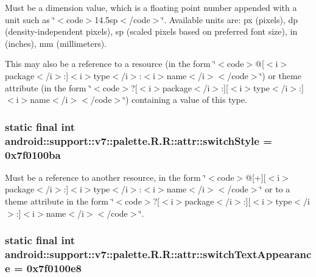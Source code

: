 Must be a dimension value, which is a floating point number appended with a unit such as \char`\"{}$<$code$>$14.5sp$<$/code$>$\char`\"{}. Available units are: px (pixels), dp (density-independent pixels), sp (scaled pixels based on preferred font size), in (inches), mm (millimeters). 

This may also be a reference to a resource (in the form \char`\"{}$<$code$>$@\mbox{[}$<$i$>$package$<$/i$>$:\mbox{]}$<$i$>$type$<$/i$>$:$<$i$>$name$<$/i$>$$<$/code$>$\char`\"{}) or theme attribute (in the form \char`\"{}$<$code$>$?\mbox{[}$<$i$>$package$<$/i$>$:\mbox{]}\mbox{[}$<$i$>$type$<$/i$>$:\mbox{]}$<$i$>$name$<$/i$>$$<$/code$>$\char`\"{}) containing a value of this type. \hypertarget{classandroid_1_1support_1_1v7_1_1palette_1_1_r_1_1attr_dec306b410d3ba4124ff77b3e5f9380a}{
\subsubsection[{switchStyle}]{\setlength{\rightskip}{0pt plus 5cm}static final int android::support::v7::palette.R.R::attr::switchStyle = 0x7f0100ba}}
\label{classandroid_1_1support_1_1v7_1_1palette_1_1_r_1_1attr_dec306b410d3ba4124ff77b3e5f9380a}


Must be a reference to another resource, in the form \char`\"{}$<$code$>$@\mbox{[}+\mbox{]}\mbox{[}$<$i$>$package$<$/i$>$:\mbox{]}$<$i$>$type$<$/i$>$:$<$i$>$name$<$/i$>$$<$/code$>$\char`\"{} or to a theme attribute in the form \char`\"{}$<$code$>$?\mbox{[}$<$i$>$package$<$/i$>$:\mbox{]}\mbox{[}$<$i$>$type$<$/i$>$:\mbox{]}$<$i$>$name$<$/i$>$$<$/code$>$\char`\"{}. \hypertarget{classandroid_1_1support_1_1v7_1_1palette_1_1_r_1_1attr_b26cdef79860bfbc15dc48c62fd68351}{
\subsubsection[{switchTextAppearance}]{\setlength{\rightskip}{0pt plus 5cm}static final int android::support::v7::palette.R.R::attr::switchTextAppearance = 0x7f0100e8}}
\label{classandroid_1_1support_1_1v7_1_1palette_1_1_r_1_1attr_b26cdef79860bfbc15dc48c62fd68351}


